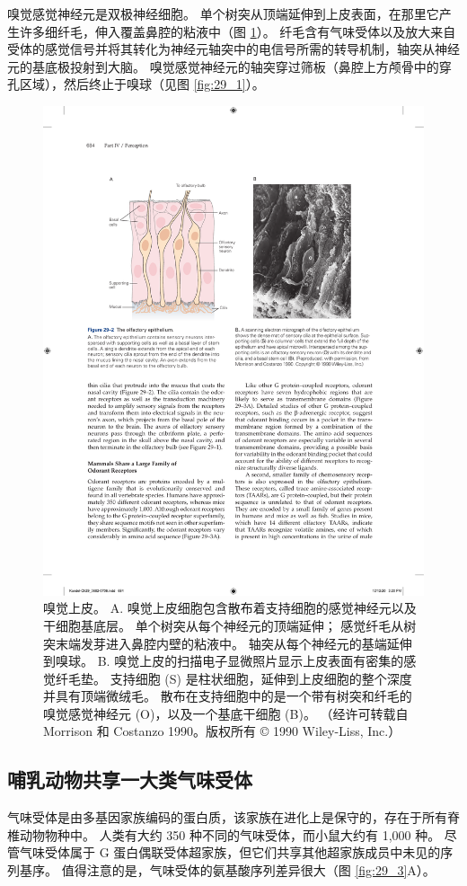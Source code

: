 嗅觉感觉神经元是双极神经细胞。 
单个树突从顶端延伸到上皮表面，在那里它产生许多细纤毛，伸入覆盖鼻腔的粘液中（图 \ref{fig:29_2}）。
纤毛含有气味受体以及放大来自受体的感觉信号并将其转化为神经元轴突中的电信号所需的转导机制，轴突从神经元的基底极投射到大脑。
嗅觉感觉神经元的轴突穿过筛板（鼻腔上方颅骨中的穿孔区域），然后终止于嗅球（见图 \ref{fig:29_1}）。


\begin{figure}[htbp]
	\centering
	\includegraphics[width=0.8\linewidth]{chap29/fig_29_2}
	\caption{嗅觉上皮。 A. 嗅觉上皮细胞包含散布着支持细胞的感觉神经元以及干细胞基底层。 单个树突从每个神经元的顶端延伸； 感觉纤毛从树突末端发芽进入鼻腔内壁的粘液中。 轴突从每个神经元的基端延伸到嗅球。 B. 嗅觉上皮的扫描电子显微照片显示上皮表面有密集的感觉纤毛垫。 支持细胞 (S) 是柱状细胞，延伸到上皮细胞的整个深度并具有顶端微绒毛。 散布在支持细胞中的是一个带有树突和纤毛的嗅觉感觉神经元 (O)，以及一个基底干细胞 (B)。 （经许可转载自 Morrison 和 Costanzo 1990。版权所有 © 1990 Wiley-Liss, Inc.）}
	\label{fig:29_2}
\end{figure}


\subsection{哺乳动物共享一大类气味受体}
气味受体是由多基因家族编码的蛋白质，该家族在进化上是保守的，存在于所有脊椎动物物种中。
人类有大约 350 种不同的气味受体，而小鼠大约有 1,000 种。 
尽管气味受体属于 G 蛋白偶联受体超家族，但它们共享其他超家族成员中未见的序列基序。 
值得注意的是，气味受体的氨基酸序列差异很大（图 \ref{fig:29_3}A）。


